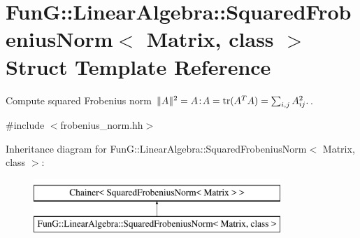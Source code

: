 \hypertarget{structFunG_1_1LinearAlgebra_1_1SquaredFrobeniusNorm}{\section{Fun\-G\-:\-:Linear\-Algebra\-:\-:Squared\-Frobenius\-Norm$<$ Matrix, class $>$ Struct Template Reference}
\label{structFunG_1_1LinearAlgebra_1_1SquaredFrobeniusNorm}
}


Compute squared Frobenius norm $ \|A\|^2 = A\negthinspace : \negthinspace A = \mathrm{tr}(A^TA) = \sum_{i,j} A_{ij}^2. $.  




{\ttfamily \#include $<$frobenius\-\_\-norm.\-hh$>$}

Inheritance diagram for Fun\-G\-:\-:Linear\-Algebra\-:\-:Squared\-Frobenius\-Norm$<$ Matrix, class $>$\-:\begin{figure}[H]
\begin{center}
\leavevmode
\includegraphics[height=2.000000cm]{structFunG_1_1LinearAlgebra_1_1SquaredFrobeniusNorm}
\end{center}
\end{figure}
